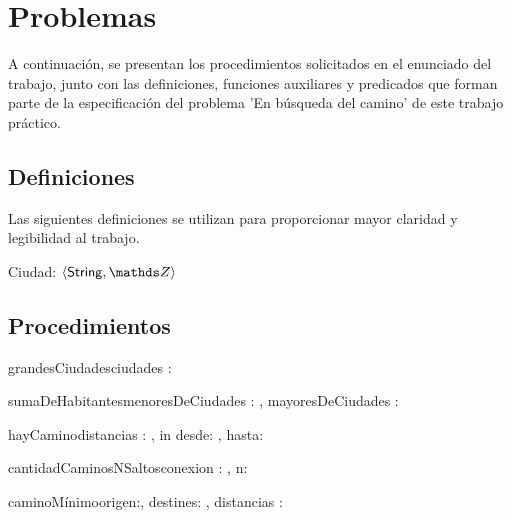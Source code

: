 \documentclass[10pt,a4paper]{article}
\newcommand{\ciudad}{\ensuremath{\langle \mathsf{String} , \ent \rangle}}
\newcommand{\matrizEnt}{\TLista{\TLista{\ent}}}
\begin{document}
\maketitle

\section{Problemas}
A continuación, se presentan los procedimientos solicitados en el enunciado del trabajo, junto con las definiciones, funciones auxiliares y predicados que forman parte de la especificación del problema 'En búsqueda del camino' de este trabajo práctico.

\subsection{Definiciones}
Las siguientes definiciones se utilizan para proporcionar mayor claridad y legibilidad al trabajo.

Ciudad:   \ciudad


\subsection{Procedimientos}


\begin{proc}{grandesCiudades}{\In ciudades : }{ }
\end{proc}

\begin{proc}{sumaDeHabitantes}{\In menoresDeCiudades : , \In mayoresDeCiudades : }{ }
\end{proc}

\begin{proc}{hayCamino}{\In distancias : \matrizEnt, in desde: \ent, hasta: \ent}{ \bool}
\end{proc}

\begin{proc}{cantidadCaminosNSaltos}{\Inout conexion : \TLista{\TLista{\ent}}, \In n: \ent}{}
\end{proc}


\begin{proc}{caminoMínimo}{\In origen:\ent , \In destines: \ent , \In distancias : \TLista{\TLista{\ent}}}{ \TLista{\ent}}
\end{proc}
\end{document}
